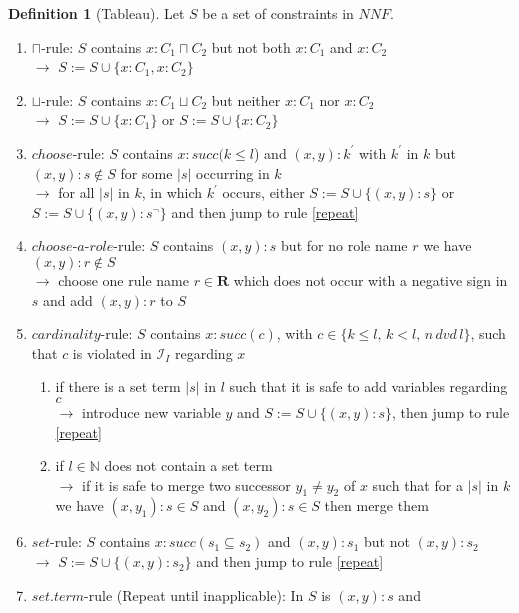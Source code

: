\documentclass[a4paper,11pt]{scrartcl}
\theoremstyle{break}
\theoremstyle{definition}
\newtheorem{mydef}{Definition}
\begin{document}
\begin{mydef}[Tableau]
Let $S$ be a set of constraints in $NNF$.
\begin{enumerate}
\item\label{cap} $\sqcap$-rule: $S$ contains $x:C_1\sqcap C_2$ but not both $x:C_1$ and $x:C_2$\\
$\rightarrow$ $S:=S\cup\{x:C_1, x:C_2\}$
\item\label{cup} $\sqcup$-rule: $S$ contains $x:C_1\sqcup C_2$ but neither $x:C_1$ nor $x:C_2$\\
$\rightarrow$ $S:=S\cup\{x:C_1\}$ or $S:=S\cup\{x:C_2\}$
\item\label{choose}$choose$-rule: $S$ contains
$x:succ(k\leq l$) and $(x,y):k^\prime$ with $k^\prime$ in $k$ but $(x,y):s\not\in S$ for some $|s|$ occurring in $k$\\
$\rightarrow$ for all $|s|$ in $k$, in which $k^\prime$ occurs, either $S:=S\cup\{(x,y):s\}$ or $S:=S\cup\{(x,y):s^\neg\}$ and then jump to rule \ref{repeat}
\item\label{chooserole}$choose$-$a$-$role$-rule: $S$ contains $(x,y):s$ but for no role name $r$ we have $(x,y):r\notin S$\\
$\rightarrow$ choose one rule name $r\in\mathbf{R}$ which does not occur with a negative sign in $s$ and add $(x,y):r$ to $S$
\item\label{c}$cardinality$-rule: $S$ contains $x:succ(c)$, with $c\in\{k\leq l,\,k<l,\, n\, dvd\,l\}$, such that $c$ is violated in $\mathcal{I}_I$ regarding $x$
\begin{enumerate}
\item \label{setterm} if there is a set term $|s|$ in $l$ such that it is safe to add variables regarding $c$\\
$\rightarrow$ introduce new variable $y$ and $S:=S\cup\{(x,y):s\}$, then jump to rule \ref{repeat}
\item \label{exceeded} if $l\in \mathbb{N}$ does not contain a set term\\
$\rightarrow$ if it is safe to merge two successor $y_1\neq y_2$ of $x$ such that for a $|s|$ in $k$ we have $(x,y_1):s\in S$ and $(x,y_2):s\in S$ then merge them
\end{enumerate}
\item\label{s}$set$-rule: $S$ contains $x:succ(s_1\subseteq s_2)$ and $(x,y):s_1$ but not $(x,y):s_2$\\
$\rightarrow$ $S:=S\cup\{(x,y):s_2\}$ and then jump to rule \ref{repeat}
\item\label{repeat} $set.term$-rule (Repeat until inapplicable): In $S$ is $(x,y):s$ and

\end{enumerate}
\end{mydef}
\end{document}
